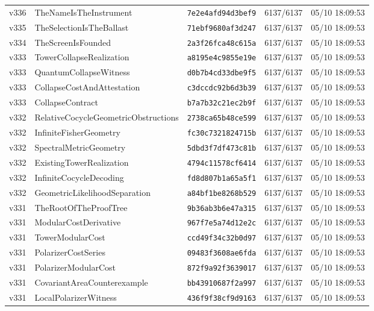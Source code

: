 \documentclass[11pt]{article}
\theoremstyle{definition}\newtheorem{deriv}{Derivation}
\begin{document}
{\begin{longtable}{@{}lllll@{}}
v336 & TheNameIsTheInstrument & \texttt{7e2e4afd94d3bef9} & 6137/6137 & 05/10 18:09:53 \\
v335 & TheSelectionIsTheBallast & \texttt{71ebf9680af3d247} & 6137/6137 & 05/10 18:09:53 \\
v334 & TheScreenIsFounded & \texttt{2a3f26fca48c615a} & 6137/6137 & 05/10 18:09:53 \\
v333 & TowerCollapseRealization & \texttt{a8195e4c9855e19e} & 6137/6137 & 05/10 18:09:53 \\
v333 & QuantumCollapseWitness & \texttt{d0b7b4cd33dbe9f5} & 6137/6137 & 05/10 18:09:53 \\
v333 & CollapseCostAndAttestation & \texttt{c3dccdc92b6d3b39} & 6137/6137 & 05/10 18:09:53 \\
v333 & CollapseContract & \texttt{b7a7b32c21ec2b9f} & 6137/6137 & 05/10 18:09:53 \\
v332 & RelativeCocycleGeometricObstructions & \texttt{2738ca65b48ce599} & 6137/6137 & 05/10 18:09:53 \\
v332 & InfiniteFisherGeometry & \texttt{fc30c7321824715b} & 6137/6137 & 05/10 18:09:53 \\
v332 & SpectralMetricGeometry & \texttt{5dbd3f7df473c81b} & 6137/6137 & 05/10 18:09:53 \\
v332 & ExistingTowerRealization & \texttt{4794c11578cf6414} & 6137/6137 & 05/10 18:09:53 \\
v332 & InfiniteCocycleDecoding & \texttt{fd8d807b1a65a5f1} & 6137/6137 & 05/10 18:09:53 \\
v332 & GeometricLikelihoodSeparation & \texttt{a84bf1be8268b529} & 6137/6137 & 05/10 18:09:53 \\
v331 & TheRootOfTheProofTree & \texttt{9b36ab3b6e47a315} & 6137/6137 & 05/10 18:09:53 \\
v331 & ModularCostDerivative & \texttt{967f7e5a74d12e2c} & 6137/6137 & 05/10 18:09:53 \\
v331 & TowerModularCost & \texttt{ccd49f34c32b0d97} & 6137/6137 & 05/10 18:09:53 \\
v331 & PolarizerCostSeries & \texttt{09483f3608ae6fda} & 6137/6137 & 05/10 18:09:53 \\
v331 & PolarizerModularCost & \texttt{872f9a92f3639017} & 6137/6137 & 05/10 18:09:53 \\
v331 & CovariantAreaCounterexample & \texttt{bb43910687f2a997} & 6137/6137 & 05/10 18:09:53 \\
v331 & LocalPolarizerWitness & \texttt{436f9f38cf9d9163} & 6137/6137 & 05/10 18:09:53 \\

\end{longtable}}
\end{document}

